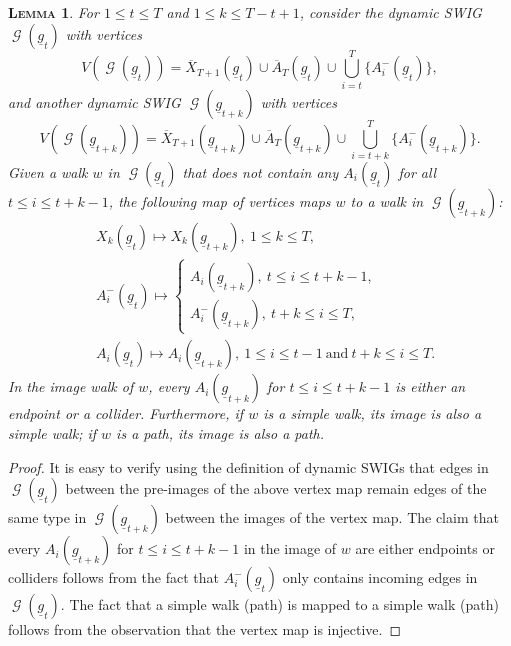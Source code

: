 \documentclass[12pt,a4paper]{article}
\newtheorem{lemma}[theorem]{\normalfont\scshape  Lemma}
\theoremstyle{definition}
\DeclareMathOperator{\gG}{\mathscr{G}}
\begin{document}
\begin{lemma} \label{lem:vertex-map}
  For $1 \leq t \leq T$ and $1 \leq k \leq T - t +1$, consider the
  dynamic SWIG $\gG(\underline{g}_t)$ with vertices
  \[
    V(\gG(\underline{g}_{t})) = \overline{X}_{T+1}(\underline{g}_{t})
    \cup \overline{A}_T(\underline{g}_{t}) \cup \bigcup_{i=t}^T
    \{A_i^-(\underline{g}_{t})\},
  \]
  and another dynamic SWIG $\gG(\underline{g}_{t+k})$ with vertices
  \[
    V(\gG(\underline{g}_{t+k})) = \overline{X}_{T+1}(\underline{g}_{t+k})
    \cup \overline{A}_T(\underline{g}_{t+k}) \cup \bigcup_{i=t+k}^T
    \{A_i^-(\underline{g}_{t+k})\}.
  \]
  Given a walk $w$ in $\gG(\underline{g}_{t})$ that does not contain
  any $A_i(\underline{g}_t)$ for all $t \leq i \leq t+k-1$,
  the following map of vertices maps $w$ to a walk in
  $\gG(\underline{g}_{t+k})$:
  \begin{align*}
      &X_k(\underline{g}_t) \mapsto X_k(\underline{g}_{t+k}), ~ 1
        \leq k \leq T, \\
      &A_i^{-}(\underline{g}_t) \mapsto
      \begin{cases}
          A_i(\underline{g}_{t+k}), ~ t \leq i \leq t + k - 1, \\
          A_i^{-}(\underline{g}_{t+k}), ~ t+k \leq i \leq T,
      \end{cases} \\
      &A_i(\underline{g}_t) \mapsto A_i(\underline{g}_{t+k}), ~ 1
        \leq i \leq t-1 ~\text{and}~ t+k \leq i \leq T.
  \end{align*}
  In the image walk of $w$, every $A_i(\underline{g}_{t+k})$ for $t
  \leq i \leq t + k - 1$ is either an endpoint or
  a collider. Furthermore, if $w$ is a simple walk, its image is also a
  simple walk; if $w$ is a path, its image is also a path.
\end{lemma}
\begin{proof}
It is easy to verify using the definition of dynamic SWIGs that
edges in $\gG(\underline{g}_t)$ between the pre-images of the above vertex
map remain edges of the same type in $\gG(\underline{g}_{t+k})$
between the images of the vertex map. The claim that every $A_i(\underline{g}_{t+k})$ for $t \leq i \leq t + k - 1$ in the image of $w$ are either endpoints or colliders follows from the fact that $A_i^{-}(\underline{g}_t)$ only contains incoming edges in $\gG(\underline{g}_{t})$. The fact that a simple walk
(path) is mapped to a simple walk (path) follows from the
observation that the vertex map is injective.
\end{proof}
\end{document}
